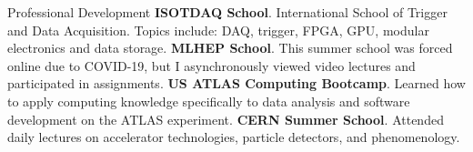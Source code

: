 \begin{rubric}{Professional Development}
\entry*[2022] \textbf{ISOTDAQ School}. International School of Trigger and Data Acquisition.  Topics include: DAQ, trigger, FPGA, GPU, modular electronics and data storage.
%
\entry*[2020]%
\textbf{MLHEP School}. This summer school was forced online due to COVID-19, but I asynchronously viewed video lectures and participated in assignments.
%
\entry*[2019]%
\textbf{US ATLAS Computing Bootcamp}. Learned how to apply computing knowledge specifically to data analysis and software development on the ATLAS experiment.
%
\entry*[2017]%
\textbf{CERN Summer School}. Attended daily lectures on accelerator technologies, particle detectors, and phenomenology.
%
\end{rubric}